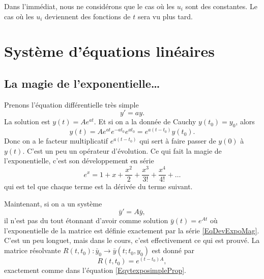 Dans l'immédiat, nous ne considérons que le cas où les \( u_i\) sont des constantes. Le cas où les \( u_i\) deviennent des fonctions de \( t\) sera vu plus tard.

\section{Système d'équations linéaires}

\subsection{La magie de l'exponentielle\ldots}
\label{SUBSECooMDKIooKaaKlZ}

Prenons l'équation différentielle très simple
\begin{equation}
	y'=ay.
\end{equation}
La solution est \( y(t)=A e^{at}\). Et si on a la donnée de Cauchy \( y(t_0)=y_0\), alors
\begin{equation}		\label{EqytexposimpleProp}
	y(t)=A e^{at} e^{-at_0} e^{at_0}= e^{a(t-t_0)}y(t_0).
\end{equation}
Donc on a le facteur multiplicatif \(  e^{a(t-t_0)}\) qui sert à faire passer de \( y(0)\) à \( y(t)\). C'est un peu un opérateur d'évolution. Ce qui fait la magie  de l'exponentielle, c'est son développement en série
\begin{equation}		\label{EqDevExpoMag}
	e^x=1+x+\frac{ x^2 }{ 2 }+\frac{ x^3 }{ 3! }+\frac{ x^4 }{ 4! }+\ldots
\end{equation}
qui est tel que chaque terme est la dérivée du terme suivant.

Maintenant, si on a un système
\begin{equation}
	\bar y'=A\bar y,
\end{equation}
il n'est pas du tout étonnant d'avoir comme solution \( \bar y(t)= e^{At}\) où l'exponentielle de la matrice est définie exactement par la série \eqref{EqDevExpoMag}. C'est un peu longuet, mais dans le cours, c'est effectivement ce qui est prouvé. La matrice résolvante \( R(t,t_0)\colon \bar y_0\to \bar y(t;t_0,y_0)\) est donné par
\begin{equation}
	R(t,t_0)= e^{(t-t_0)A},
\end{equation}
exactement comme dans l'équation \eqref{EqytexposimpleProp}.

